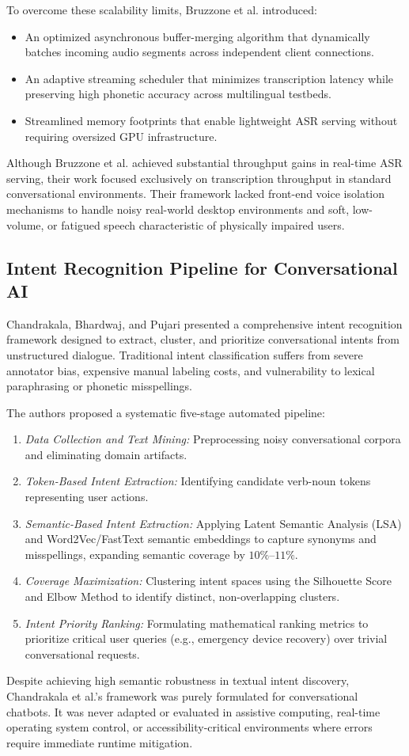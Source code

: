 \documentclass[12pt,a4paper]{report}
\begin{document}
To overcome these scalability limits, Bruzzone et al. introduced:
\begin{itemize}
    \item An optimized asynchronous buffer-merging algorithm that dynamically batches incoming audio segments across independent client connections.
    \item An adaptive streaming scheduler that minimizes transcription latency while preserving high phonetic accuracy across multilingual testbeds.
    \item Streamlined memory footprints that enable lightweight ASR serving without requiring oversized GPU infrastructure.
\end{itemize}
Although Bruzzone et al. achieved substantial throughput gains in real-time ASR serving, their work focused exclusively on transcription throughput in standard conversational environments. Their framework lacked front-end voice isolation mechanisms to handle noisy real-world desktop environments and soft, low-volume, or fatigued speech characteristic of physically impaired users.

\subsection{Intent Recognition Pipeline for Conversational AI}
Chandrakala, Bhardwaj, and Pujari \cite{chandrakala2024intent} presented a comprehensive intent recognition framework designed to extract, cluster, and prioritize conversational intents from unstructured dialogue. Traditional intent classification suffers from severe annotator bias, expensive manual labeling costs, and vulnerability to lexical paraphrasing or phonetic misspellings.

The authors proposed a systematic five-stage automated pipeline:
\begin{enumerate}
    \item \textit{Data Collection and Text Mining:} Preprocessing noisy conversational corpora and eliminating domain artifacts.
    \item \textit{Token-Based Intent Extraction:} Identifying candidate verb-noun tokens representing user actions.
    \item \textit{Semantic-Based Intent Extraction:} Applying Latent Semantic Analysis (LSA) and Word2Vec/FastText semantic embeddings to capture synonyms and misspellings, expanding semantic coverage by $10\%$--$11\%$.
    \item \textit{Coverage Maximization:} Clustering intent spaces using the Silhouette Score and Elbow Method to identify distinct, non-overlapping clusters.
    \item \textit{Intent Priority Ranking:} Formulating mathematical ranking metrics to prioritize critical user queries (e.g., emergency device recovery) over trivial conversational requests.
\end{enumerate}
Despite achieving high semantic robustness in textual intent discovery, Chandrakala et al.'s framework was purely formulated for conversational chatbots. It was never adapted or evaluated in assistive computing, real-time operating system control, or accessibility-critical environments where errors require immediate runtime mitigation.
\end{document}
